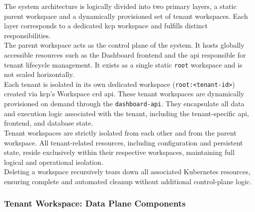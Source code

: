 \documentclass[11pt, a4paper, oneside, listof=totoc]{scrartcl}
\begin{document}
                The system architecture is logically divided into two primary layers, a static
                parent workspace and a dynamically provisioned set of tenant workspaces.
                Each layer corresponds to a dedicated \gls{kcp} workspace and fulfills distinct
                responsibilities.
                \\
                The parent workspace acts as the control plane of the system.
                It hosts globally accessible resources such as the Dashboard frontend and the
                \gls{api} responsible for tenant lifecycle management.
                It exists as a single static \texttt{root} workspace and is not scaled horizontally.
                \\
                Each tenant is isolated in its own dedicated workspace (\texttt{root:<tenant-id>})
                created via \gls{kcp}'s Workspace \gls{crd} \gls{api}.
                These tenant workspaces are dynamically provisioned on demand through the
                \texttt{dashboard-\gls{api}}.
                They encapsulate all data and execution logic associated with the tenant, including
                the tenant-specific \gls{api}, frontend, and database state.
                \\
                Tenant workspaces are strictly isolated from each other and from the parent
                workspace.
                All tenant-related resources, including configuration and persistent state, reside
                exclusively within their respective workspaces, maintaining full logical and
                operational isolation.
                \\
                Deleting a workspace recursively tears down all associated Kubernetes resources,
                ensuring complete and automated cleanup without additional control-plane logic.
                \cleardoublepage

            \subsubsection{Tenant Workspace: Data Plane Components}
                
\end{document}
